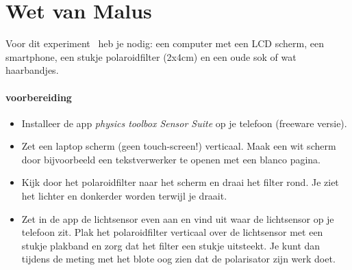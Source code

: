 \documentclass[../../main.tex]{subfiles}
\begin{document}
\onlyinsubfile{
\setcounter{chapter}{0}
}
\notinsubfile{}
\section{Wet van Malus}\label{sec:wbmalus}

Voor dit experiment~\cite{monteiro2017polarization} heb je nodig: een computer met een LCD scherm, een smartphone, een stukje polaroidfilter (2x4cm) en een oude sok of wat haarbandjes.

\paragraph{voorbereiding}
\begin{itemize}
\item Installeer de app \textit{physics toolbox Sensor Suite} op je telefoon (freeware versie).
\item Zet een laptop scherm (geen touch-screen!) verticaal. Maak een wit scherm door bijvoorbeeld een tekstverwerker te openen met een blanco pagina.
\item Kijk door het polaroidfilter naar het scherm en draai het filter rond. Je ziet het lichter en donkerder worden terwijl je draait.
\item Zet in de app de lichtsensor even aan en vind uit waar de lichtsensor op je telefoon zit. Plak het polaroidfilter verticaal over de lichtsensor met een stukje plakband en zorg dat het filter een stukje uitsteekt. Je kunt dan tijdens de meting met het blote oog zien dat de polarisator zijn werk doet.
\end{itemize}
\end{document}
